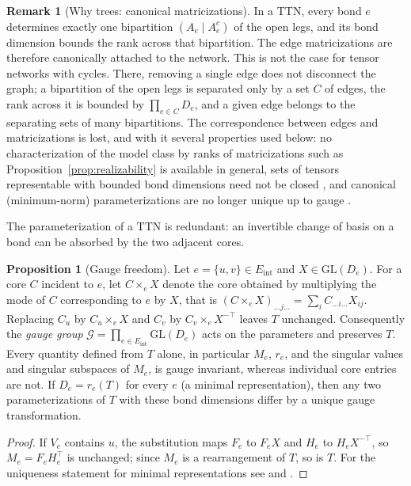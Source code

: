 \documentclass[11pt]{article}
\newcommand{\GL}{\mathrm{GL}}
\newcommand{\Eint}{E_{\mathrm{int}}}
\theoremstyle{definition}
\newtheorem{proposition}[theorem]{Proposition}
\newtheorem{remark}[theorem]{Remark}
\numberwithin{equation}{section}
\begin{document}
\begin{remark}[Why trees: canonical matricizations]\label{rem:trees}
In a TTN, every bond $e$ determines exactly one bipartition $(A_e\mid A_e^c)$ of the open legs, and its bond dimension bounds the rank across that bipartition. The edge matricizations are therefore canonically attached to the network. This is not the case for tensor networks with cycles. There, removing a single edge does not disconnect the graph; a bipartition of the open legs is separated only by a set $C$ of edges, the rank across it is bounded by $\prod_{e\in C}D_e$, and a given edge belongs to the separating sets of many bipartitions. The correspondence between edges and matricizations is lost, and with it several properties used below: no characterization of the model class by ranks of matricizations such as Proposition~\ref{prop:realizability} is available in general, sets of tensors representable with bounded bond dimensions need not be closed \citep{landsberg2012geometry}, and canonical (minimum-norm) parameterizations are no longer unique up to gauge \citep[Remark~F.7]{furman2026benign}.
\end{remark}

The parameterization of a TTN is redundant: an invertible change of basis on a bond can be absorbed by the two adjacent cores.

\begin{proposition}[Gauge freedom]\label{prop:gauge}
Let $e=\{u,v\}\in\Eint$ and $X\in\GL(D_e)$. For a core $C$ incident to $e$, let $C\times_e X$ denote the core obtained by multiplying the mode of $C$ corresponding to $e$ by $X$, that is $(C\times_eX)_{\dots j\dots}=\sum_iC_{\dots i\dots}X_{ij}$. Replacing $C_u$ by $C_u\times_eX$ and $C_v$ by $C_v\times_eX^{-\top}$ leaves $T$ unchanged. Consequently the \emph{gauge group} $\mathcal G=\prod_{e\in\Eint}\GL(D_e)$ acts on the parameters and preserves $T$. Every quantity defined from $T$ alone, in particular $M_e$, $r_e$, and the singular values and singular subspaces of $M_e$, is gauge invariant, whereas individual core entries are not. If $D_e=r_e(T)$ for every $e$ (a minimal representation), then any two parameterizations of $T$ with these bond dimensions differ by a unique gauge transformation.
\end{proposition}

\begin{proof}
If $V_e$ contains $u$, the substitution maps $F_e$ to $F_eX$ and $H_e$ to $H_eX^{-\top}$, so $M_e=F_eH_e^\top$ is unchanged; since $M_e$ is a rearrangement of $T$, so is $T$. For the uniqueness statement for minimal representations see \citet{hackbusch2012tensor} and \citet{uschmajew2013geometry}.
\end{proof}
\end{document}
